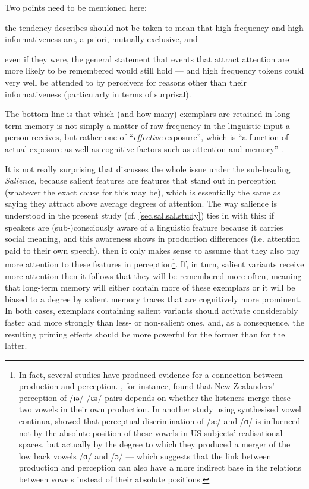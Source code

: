 Two points need to be mentioned here:
\begin{inparaenum}[(1)]
	\item the tendency \citeauthor{pierrehumbert2006} describes should not be taken to mean that high frequency and high informativeness are, a priori, mutually exclusive, and
	\item even if they were, the general statement that events that attract attention are more likely to be remembered would still hold --- and high frequency tokens could very well be attended to by perceivers for reasons other than their informativeness (particularly in terms of surprisal).
\end{inparaenum}
The bottom line is that which (and how many) exemplars are retained in long-term memory is not simply a matter of raw frequency in the linguistic input a person receives, but rather one of ``\emph{effective} exposure'', which is ``a function of actual exposure as well as cognitive factors such as attention and memory'' \parencite[519, my emphasis]{pierrehumbert2006}.

It is not really surprising that \textcite{pierrehumbert2006} discusses the whole issue under the sub-heading \emph{Salience}, because salient features are features that stand out in perception (whatever the exact cause for this may be), which is essentially the same as saying they attract above average degrees of attention.
The way salience is understood in the present study (cf. \ref{sec.sal.sal.study}) ties in with this: if speakers are (sub-)consciously aware of a linguistic feature because it carries social meaning, and this awareness shows in production differences (i.e. attention paid to their own speech), then it only makes sense to assume that they also pay more attention to these features in perception\footnote{In fact, several studies have produced evidence for a connection between production and perception. \cite{hayetal2006b}, for instance, found that New Zealanders' perception of /ɪə/-/ɛə/ pairs depends on whether the listeners merge these two vowels in their own production. In another study using synthesised vowel continua, \textcite{kendallfridland2017} showed that perceptual discrimination of /æ/ and /ɑ/ is influenced not by the absolute position of these vowels in US subjects' realisational spaces, but actually by the degree to which they produced a merger of the low back vowels /ɑ/ and /ɔ/ --- which suggests that the link between production and perception can also have a more indirect base in the relations between vowels instead of their absolute positions.}.
If, in turn, salient variants receive more attention then it follows that they will be remembered more often, meaning that long-term memory will either contain more of these exemplars or it will be biased to a degree by salient memory traces that are cognitively more prominent.
In both cases, exemplars containing salient variants should activate considerably faster and more strongly than less- or non-salient ones, and, as a consequence, the resulting priming effects should be more powerful for the former than for the latter.

